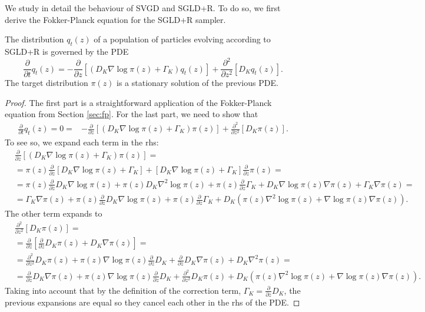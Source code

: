 We study in detail the behaviour of SVGD and SGLD+R. To do so, we first derive the Fokker-Planck equation for the SGLD+R sampler.
\begin{proposition}
The distribution $q_t({z})$ of a population of particles evolving according to SGLD+R is governed by the PDE
$$
\frac{\partial}{\partial t} q_t({z}) = -\frac{\partial}{\partial {z}} \left[ (D_K \nabla \log \pi({z}) + \Gamma_K) q_t({z})\right] + \frac{\partial^2}{\partial {z}^2} \left[ D_K q_t({z})  \right].
$$
The target distribution $\pi({z})$ is a stationary solution of the previous PDE.
\end{proposition}
\begin{proof}
The first part is a straightforward application of the Fokker-Planck equation from Section \ref{sec:fp}. For the last part, we need to show that
\begin{align*}
\frac{\partial}{\partial t} q_t({z}) = 0 = &-\frac{\partial}{\partial {z}} \left[ ({D_K} \nabla \log \pi({z}) + {\Gamma_K}) \pi({z})\right] +  \frac{\partial^2}{\partial {z}^2} \left[ {D_K} \pi({z})  \right].
\end{align*}
To see so, we expand each term in the rhs:
\begin{align*}
& \frac{\partial}{\partial {z}} \left[ ({D_K} \nabla \log \pi({z}) + {\Gamma_K}) \pi({z})\right] = \\
&= \pi({z})\frac{\partial}{\partial {z}} \left[ {D_K} \nabla \log \pi({z}) + {\Gamma_K} \right] +  \left[ {D_K} \nabla \log \pi({z}) + {\Gamma_K} \right] \frac{\partial}{\partial {z}} \pi({z}) = \\
&= \pi({z})\frac{\partial}{\partial {z}}{D_K} \nabla \log \pi({z})+ \pi({z}){D_K} \nabla^2 \log \pi({z}) + \pi({z}) \frac{\partial}{\partial {z}} {\Gamma_K} + {D_K} \nabla \log \pi({z}) \nabla \pi({z})  + {\Gamma_K} \nabla \pi({z}) = \\
&= {\Gamma_K} \nabla \pi({z}) + \pi({z})\frac{\partial}{\partial {z}}{D_K}\nabla \log \pi({z}) +  
\pi({z}) \frac{\partial}{\partial {z}} {\Gamma_K} +
{D_K}(\pi({z})\nabla^2 \log \pi({z}) + \nabla \log \pi({z}) \nabla \pi({z})).
\end{align*}
The other term expands to
\begin{align*}
&\frac{\partial^2}{\partial {z}^2} \left[ {D_K} \pi({z})  \right] = \\
&= \frac{\partial}{\partial {z}} \left[ \frac{\partial}{\partial {z}} {D_K} \pi({z}) + {D_K} \nabla \pi({z}) \right] = \\
&= \frac{\partial^2}{\partial {z}^2}{D_K} \pi({z}) + \pi({z}) \nabla \log \pi({z}) \frac{\partial}{\partial {z}}{D_K} + \frac{\partial}{\partial {z}}  {D_K} \nabla \pi({z}) + {D_K} \nabla^2 \pi({z}) = \\
&= \frac{\partial}{\partial {z}}  {D_K} \nabla \pi({z}) +
\pi({z}) \nabla \log \pi({z}) \frac{\partial}{\partial {z}}{D_K} + \frac{\partial^2}{\partial {z}^2}{D_K} \pi({z})+ 
{D_K}(\pi({z})\nabla^2 \log \pi({z}) + \nabla \log \pi({z}) \nabla \pi({z})).
\end{align*}
Taking into account that by the definition of the correction term, $\Gamma_K = \frac{\partial}{\partial {z}} D_K$, the previous expansions are equal so they cancel each other in the rhs of the PDE.
\end{proof}
